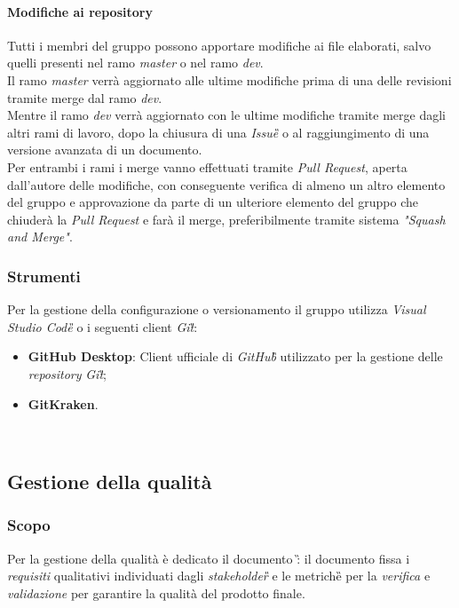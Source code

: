 		\paragraph*{Modifiche ai repository}
		\aCapo{}  
		Tutti i membri del gruppo possono apportare modifiche ai file elaborati, salvo quelli presenti nel ramo \textit{master} o nel ramo \textit{dev}. \\
		 Il ramo \textit{master} verrà aggiornato alle ultime modifiche prima di una delle revisioni tramite merge dal ramo \textit{dev}. \\
		Mentre il ramo \textit{dev} verrà aggiornato con le ultime modifiche tramite merge dagli altri rami di lavoro, dopo la chiusura di una \textit{Issue\G{}} o al raggiungimento di una versione avanzata di un documento. \\
		Per entrambi i rami i merge vanno effettuati tramite \textit{Pull Request}, aperta dall'autore delle modifiche, con conseguente verifica di almeno un altro elemento del gruppo e approvazione da parte di un ulteriore elemento del gruppo che chiuderà la \textit{Pull Request} e farà il merge, preferibilmente tramite sistema \textit{"Squash and Merge"}.
		
		\subsubsection{Strumenti}
			Per la gestione della configurazione o versionamento il gruppo utilizza \emph{Visual Studio Code\G{}} o i seguenti client \emph{Git\G}:
				
				\begin{itemize}
					\item \textbf{GitHub Desktop}: Client ufficiale di \emph{GitHub\G{}} utilizzato per la gestione delle \emph{repository} \emph{Git\G};
					\item \textbf{GitKraken}.
				\end{itemize}\
		
		\subsection{Gestione della qualità}
			\subsubsection{Scopo}
				Per la gestione della qualità è dedicato il documento \PdQ{}\G: il documento fissa i \emph{requisiti} qualitativi individuati dagli \emph{stakeholder\G{}} e le metriche\G{} per la \emph{verifica} e \emph{validazione} per garantire la qualità del prodotto finale.
		
